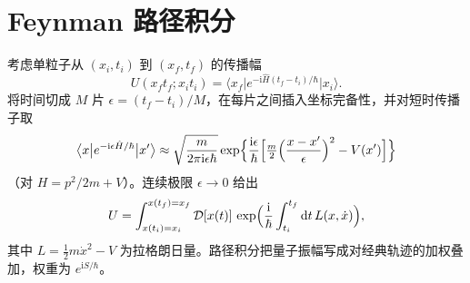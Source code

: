 \section{Feynman 路径积分}

考虑单粒子从 $(x_i,t_i)$ 到 $(x_f,t_f)$ 的传播幅
\begin{equation}
  U(x_f t_f;x_i t_i)
  =\bigl\langle x_f\big|
  e^{-\mathrm{i}\hat H(t_f-t_i)/\hbar}
  \big|x_i\bigr\rangle.
\end{equation}
将时间切成 $M$ 片 $\epsilon=(t_f-t_i)/M$，在每片之间插入坐标完备性，并对短时传播子取
\begin{equation}
  \bigl\langle x\big|e^{-\mathrm{i}\epsilon\hat H/\hbar}\big|x'\bigr\rangle
  \approx
  \sqrt{\frac{m}{2\pi\mathrm{i}\epsilon\hbar}}
  \exp\Bigl\{
  \frac{\mathrm{i}\epsilon}{\hbar}
  \Bigl[
  \tfrac{m}{2}\Bigl(\frac{x-x'}{\epsilon}\Bigr)^2
  -V(x')
  \Bigr]
  \Bigr\}
\end{equation}
（对 $H=p^2/2m+V$）。连续极限 $\epsilon\to0$ 给出
\begin{equation}
  U
  =\int_{x(t_i)=x_i}^{x(t_f)=x_f}
  \mathcal{D}[x(t)]\,
  \exp\Bigl(
  \frac{\mathrm{i}}{\hbar}
  \int_{t_i}^{t_f}\mathrm{d}t\,L(x,\dot x)
  \Bigr),
\end{equation}
其中 $L=\frac12 m\dot x^2-V$ 为拉格朗日量。路径积分把量子振幅写成对经典轨迹的加权叠加，权重为 $e^{\mathrm{i}S/\hbar}$。
